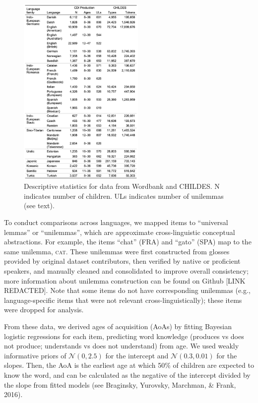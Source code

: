 \documentclass[10pt, letterpaper]{article}
\newenvironment{CodeChunk}{}{}
\begin{document}
\begin{CodeChunk}
\begin{figure}[ht]

{\centering \includegraphics[width=230px]{figs/descriptives} 

}

\caption[Descriptive statistics for data from Wordbank and CHILDES]{Descriptive statistics for data from Wordbank and CHILDES. N indicates number of children. ULs indicates number of unilemmas (see text).}\label{fig:descriptives}
\end{figure}
\end{CodeChunk}

To conduct comparisons across languages, we mapped items to ``universal
lemmas'' or ``unilemmas'', which are approximate cross-linguistic
conceptual abstractions. For example, the items ``chat'' (FRA) and
``gato'' (SPA) map to the same unilemma, \textsc{cat}. These unilemmas
were first constructed from glosses provided by original dataset
contributors, then verified by native or proficient speakers, and
manually cleaned and consolidated to improve overall consistency; more
information about unilemma construction can be found on Github {[}LINK
REDACTED{]}. Note that some items do not have corresponding unilemmas
(e.g., language-specific items that were not relevant
cross-linguistically); these items were dropped for analysis.

From these data, we derived ages of acquisition (AoAs) by fitting
Bayesian logistic regressions for each item, predicting word knowledge
(produces vs does not produce; understands vs does not understand) from
age. We used weakly informative priors of \(\mathcal{N}(0, 2.5)\) for
the intercept and \(\mathcal{N}(0.3, 0.01)\) for the slopes. Then, the
AoA is the earliest age at which 50\% of children are expected to know
the word, and can be calculated as the negative of the intercept divided
by the slope from fitted models (see Braginsky, Yurovsky, Marchman, \&
Frank, 2016).
\end{document}
